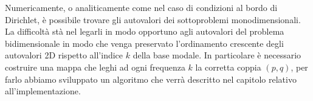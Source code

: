 Numericamente, o analiticamente come nel caso di condizioni al bordo di Dirichlet, \`e possibile
trovare gli autovalori dei sottoproblemi monodimensionali. La difficolt\`a
st\`a nel legarli in modo opportuno agli autovalori del problema bidimensionale in modo che 
venga preservato l'ordinamento crescente degli autovalori 2D rispetto all'indice $k$ della base modale.
In particolare \`e necessario costruire una mappa che leghi ad ogni frequenza $k$ 
la corretta coppia $(p,q)$, per farlo abbiamo sviluppato un algoritmo che verr\`a descritto 
nel capitolo relativo all'implementazione.
\clearpage